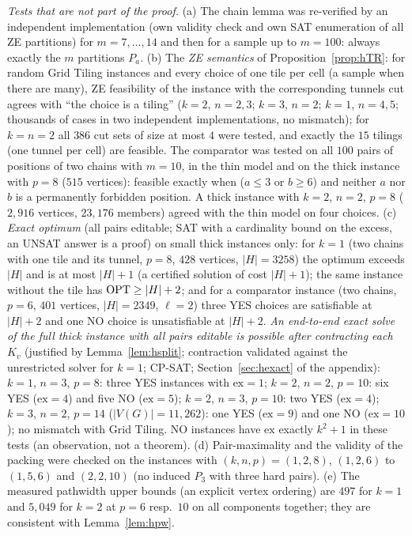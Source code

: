 \emph{Tests that are not part of the proof.} (a) The chain lemma was re-verified by an independent implementation (own validity check and own SAT enumeration of all ZE partitions) for $m=7,\dots,14$ and then for a sample up to $m=100$: always exactly the $m$ partitions $P_a$. (b) The \emph{ZE semantics} of Proposition~\ref{prop:hTR}: for random Grid Tiling instances and every choice of one tile per cell (a sample when there are many), ZE feasibility of the instance with the corresponding tunnels cut agrees with ``the choice is a tiling'' ($k=2$, $n=2,3$; $k=3$, $n=2$; $k=1$, $n=4,5$; thousands of cases in two independent implementations, no mismatch); for $k=n=2$ all $386$ cut sets of size at most $4$ were tested, and exactly the $15$ tilings (one tunnel per cell) are feasible. The comparator was tested on all $100$ pairs of positions of two chains with $m=10$, in the thin model and on the thick instance with $p=8$ ($515$ vertices): feasible exactly when ($a\le3$ or $b\ge6$) and neither $a$ nor $b$ is a permanently forbidden position. A thick instance with $k=2$, $n=2$, $p=8$ ($2{,}916$ vertices, $23{,}176$ members) agreed with the thin model on four choices. (c) \emph{Exact optimum} (all pairs editable; SAT with a cardinality bound on the excess, an UNSAT answer is a proof) on small thick instances only: for $k=1$ (two chains with one tile and its tunnel, $p=8$, $428$ vertices, $|H|=3258$) the optimum exceeds $|H|$ and is at most $|H|+1$ (a certified solution of cost $|H|+1$); the same instance without the tile has $\mathrm{OPT}\ge|H|+2$; and for a comparator instance (two chains, $p=6$, $401$ vertices, $|H|=2349$, $\ell=2$) three YES choices are satisfiable at $|H|+2$ and one NO choice is unsatisfiable at $|H|+2$. \emph{An end-to-end exact solve of the full thick instance with all pairs editable is possible after contracting each $K_v$} (justified by Lemma~\ref{lem:hsplit}; contraction validated against the unrestricted solver for $k=1$; CP-SAT; Section~\ref{sec:hexact} of the appendix): $k=1$, $n=3$, $p=8$: three YES instances with $\mathrm{ex}=1$; $k=2$, $n=2$, $p=10$: six YES ($\mathrm{ex}=4$) and five NO ($\mathrm{ex}=5$); $k=2$, $n=3$, $p=10$: two YES ($\mathrm{ex}=4$); $k=3$, $n=2$, $p=14$ ($|V(G)|=11{,}262$): one YES ($\mathrm{ex}=9$) and one NO ($\mathrm{ex}=10$); no mismatch with Grid Tiling. NO instances have $\mathrm{ex}$ exactly $k^2+1$ in these tests (an observation, not a theorem). (d) Pair-maximality and the validity of the packing were checked on the instances with $(k,n,p)=(1,2,8)$, $(1,2,6)$ to $(1,5,6)$ and $(2,2,10)$ (no induced $P_3$ with three hard pairs). (e) The measured pathwidth upper bounds (an explicit vertex ordering) are $497$ for $k=1$ and $5{,}049$ for $k=2$ at $p=6$ resp.\ $10$ on all components together; they are consistent with Lemma~\ref{lem:hpw}.

